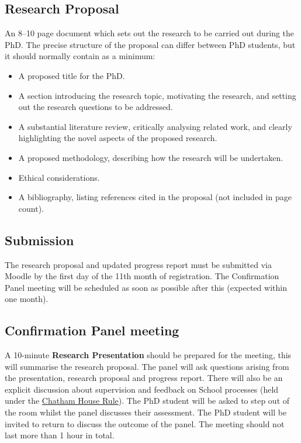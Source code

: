\documentclass[12pt,a4paper]{article}
\begin{document}
\subsection{Research Proposal}
An 8--10 page document which sets out the research to be carried out during the PhD. The precise structure of the proposal can differ between PhD students, but it should normally contain as a minimum:
\begin{itemize}
	\item A proposed title for the PhD.
	\item A section introducing the research topic, motivating the research, and setting out the research questions to be addressed.
	\item A substantial literature review, critically analysing related work, and clearly highlighting the novel aspects of the proposed research.
	\item A proposed methodology, describing how the research will be undertaken.
	\item Ethical considerations.
	\item A bibliography, listing references cited in the proposal (not included in page count).
\end{itemize}

\subsection{Submission}
The research proposal and updated progress report must be submitted via Moodle by the first day of the 11th month of registration. The Confirmation Panel meeting will be scheduled as soon as possible after this (expected within one month).

\subsection{Confirmation Panel meeting}
A 10-minute \textbf{Research Presentation} should be prepared for the meeting, this will summarise the research proposal. The panel will ask questions arising from the presentation, research proposal and progress report. There will also be an explicit discussion about supervision and feedback on School processes (held under the \href{https://www.chathamhouse.org/chatham-house-rule}{Chatham House Rule}). The PhD student will be asked to step out of the room whilst the panel discusses their assessment. The PhD student will be invited to return to discuss the outcome of the panel. The meeting should not last more than 1 hour in total.
\end{document}
